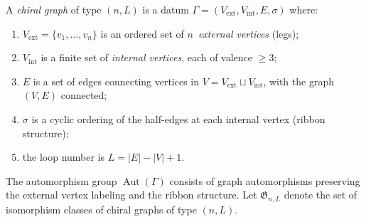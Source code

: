 \begin{definition}\label{def:chiral-graph}
A \emph{chiral graph} of type $(n, L)$ is a datum
$\Gamma = (V_{\mathrm{ext}}, V_{\mathrm{int}}, E, \sigma)$ where:
\begin{enumerate}[label=\textup{(\roman*)}]
\item $V_{\mathrm{ext}} = \{v_1, \ldots, v_n\}$ is an ordered set of
 $n$~\emph{external vertices} (legs);
\item $V_{\mathrm{int}}$ is a finite set of \emph{internal vertices},
 each of valence $\geq 3$;
\item $E$ is a set of edges connecting vertices in
 $V = V_{\mathrm{ext}} \sqcup V_{\mathrm{int}}$, with the graph
 $(V, E)$ connected;
\item $\sigma$ is a cyclic ordering of the half-edges at each internal
 vertex (ribbon structure);
\item the loop number is $L = |E| - |V| + 1$.
\end{enumerate}
The automorphism group $\operatorname{Aut}(\Gamma)$ consists of
graph automorphisms preserving the external vertex labeling and the
ribbon structure. Let $\mathfrak{G}_{n,L}$ denote the set of
isomorphism classes of chiral graphs of type $(n, L)$.
\end{definition}

